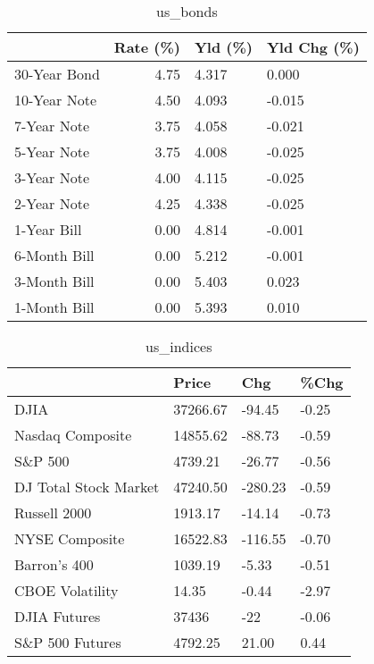 \documentclass{article}%
\begin{document}
%


\begin{table}[htbp]%
\caption{us\_bonds}%
\centering%
\begin{adjustbox}{width=1\textwidth}%
\begin{tabular}{lrll}
\toprule
             &  Rate (\%) & Yld (\%) & Yld Chg (\%) \\
\midrule
30-Year Bond &      4.75 &   4.317 &       0.000 \\
10-Year Note &      4.50 &   4.093 &      -0.015 \\
 7-Year Note &      3.75 &   4.058 &      -0.021 \\
 5-Year Note &      3.75 &   4.008 &      -0.025 \\
 3-Year Note &      4.00 &   4.115 &      -0.025 \\
 2-Year Note &      4.25 &   4.338 &      -0.025 \\
 1-Year Bill &      0.00 &   4.814 &      -0.001 \\
6-Month Bill &      0.00 &   5.212 &      -0.001 \\
3-Month Bill &      0.00 &   5.403 &       0.023 \\
1-Month Bill &      0.00 &   5.393 &       0.010 \\
\bottomrule
\end{tabular}
%
\end{adjustbox}%
\end{table}

%


\begin{table}[htbp]%
\caption{us\_indices}%
\centering%
\begin{adjustbox}{width=1\textwidth}%
\begin{tabular}{llll}
\toprule
                      &    Price &     Chg &  \%Chg \\
\midrule
                 DJIA & 37266.67 &  -94.45 & -0.25 \\
     Nasdaq Composite & 14855.62 &  -88.73 & -0.59 \\
              S\&P 500 &  4739.21 &  -26.77 & -0.56 \\
DJ Total Stock Market & 47240.50 & -280.23 & -0.59 \\
         Russell 2000 &  1913.17 &  -14.14 & -0.73 \\
       NYSE Composite & 16522.83 & -116.55 & -0.70 \\
         Barron's 400 &  1039.19 &   -5.33 & -0.51 \\
      CBOE Volatility &    14.35 &   -0.44 & -2.97 \\
         DJIA Futures &    37436 &     -22 & -0.06 \\
      S\&P 500 Futures &  4792.25 &   21.00 &  0.44 \\
\bottomrule
\end{tabular}
%
\end{adjustbox}%
\end{table}
\end{document}
